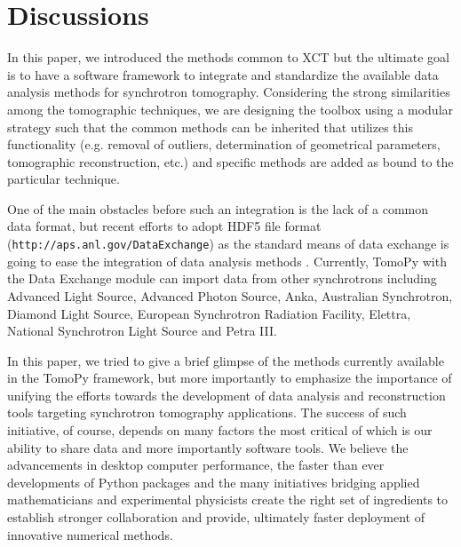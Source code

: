 \documentclass[pdf]{iucr}              %
\begin{document}


\section{Discussions}

In this paper, we introduced the methods common to XCT but the ultimate goal is to have a software framework to integrate and standardize the available data analysis methods for synchrotron tomography. Considering the strong similarities among the tomographic techniques, we are designing the toolbox using a modular strategy such that the common methods can be inherited that utilizes this functionality (e.g. removal of outliers, determination of geometrical parameters, tomographic reconstruction, etc.) and specific methods are added as bound to the particular technique. 

One of the main obstacles before such an integration is the lack of a common data format, but recent efforts to adopt HDF5 file format (\texttt{http://aps.anl.gov/DataExchange}) as the standard means of data exchange is going to ease the integration of data analysis methods \cite{Francesco2014}. Currently, TomoPy with the Data Exchange module can import data from other synchrotrons including Advanced Light Source, Advanced Photon Source, Anka, Australian Synchrotron, Diamond Light Source, European Synchrotron Radiation Facility, Elettra, National Synchrotron Light Source and Petra III. 

In this paper, we tried to give a brief glimpse of the methods currently available in the TomoPy framework, but more importantly to emphasize the importance of unifying the efforts towards the development of data analysis and reconstruction tools targeting synchrotron tomography applications. The success of such initiative, of course, depends on many factors the most critical of which is our ability to share data and more importantly software tools. We believe the advancements in desktop computer performance, the faster than ever developments of Python packages and the many initiatives bridging applied mathematicians and experimental physicists create the right set of ingredients to establish stronger collaboration and provide, ultimately faster deployment of innovative numerical methods.
\end{document}
